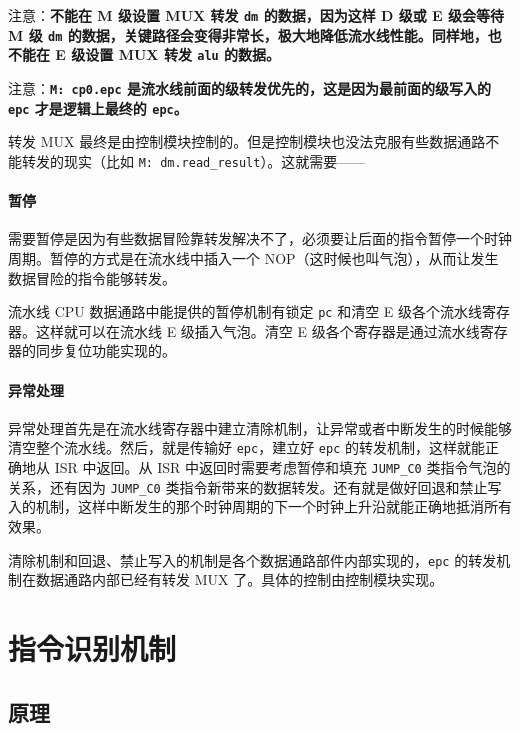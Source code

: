 \documentclass[12pt,AutoFakeBold,AutoFakeSlant]{article}
\begin{document}
注意：\textbf{不能在 M 级设置 MUX 转发 \texttt{dm} 的数据，因为这样 D
级或 E 级会等待 M 级 \texttt{dm}
的数据，关键路径会变得非常长，极大地降低流水线性能。同样地，也不能在 E
级设置 MUX 转发 \texttt{alu} 的数据。}

注意：\textbf{\texttt{M:\ cp0.epc}
是流水线前面的级转发优先的，这是因为最前面的级写入的 \texttt{epc}
才是逻辑上最终的 \texttt{epc}。}

转发 MUX
最终是由控制模块控制的。但是控制模块也没法克服有些数据通路不能转发的现实（比如
\texttt{M:\ dm.read\_result}）。这就需要------

\hypertarget{ux6682ux505c}{%
\paragraph{暂停}\label{ux6682ux505c}}

需要暂停是因为有些数据冒险靠转发解决不了，必须要让后面的指令暂停一个时钟周期。暂停的方式是在流水线中插入一个
NOP（这时候也叫气泡），从而让发生数据冒险的指令能够转发。

流水线 CPU 数据通路中能提供的暂停机制有锁定 \texttt{pc} 和清空 E
级各个流水线寄存器。这样就可以在流水线 E 级插入气泡。清空 E
级各个寄存器是通过流水线寄存器的同步复位功能实现的。

\hypertarget{ux5f02ux5e38ux5904ux7406}{%
\paragraph{异常处理}\label{ux5f02ux5e38ux5904ux7406}}

异常处理首先是在流水线寄存器中建立清除机制，让异常或者中断发生的时候能够清空整个流水线。然后，就是传输好
\texttt{epc}，建立好 \texttt{epc} 的转发机制，这样就能正确地从 ISR
中返回。从 ISR 中返回时需要考虑暂停和填充 \texttt{JUMP\_C0}
类指令气泡的关系，还有因为 \texttt{JUMP\_C0}
类指令新带来的数据转发。还有就是做好回退和禁止写入的机制，这样中断发生的那个时钟周期的下一个时钟上升沿就能正确地抵消所有效果。

清除机制和回退、禁止写入的机制是各个数据通路部件内部实现的，\texttt{epc}
的转发机制在数据通路内部已经有转发 MUX 了。具体的控制由控制模块实现。

\hypertarget{ux6307ux4ee4ux8bc6ux522bux673aux5236}{%
\section{指令识别机制}\label{ux6307ux4ee4ux8bc6ux522bux673aux5236}}

\hypertarget{ux539fux7406-13}{%
\subsection{原理}\label{ux539fux7406-13}}
\end{document}
